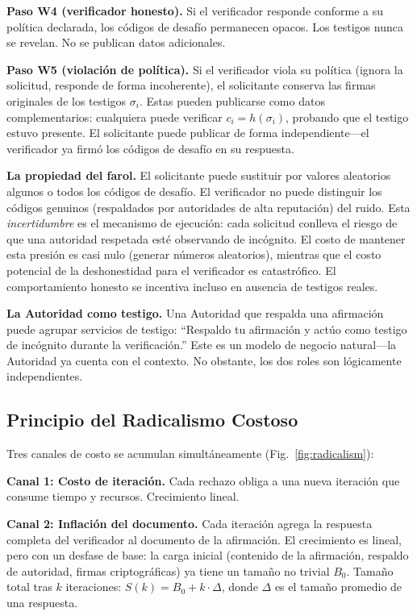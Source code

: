 \documentclass[11pt,a4paper,twocolumn]{article}
\begin{document}
\textbf{Paso W4 (verificador honesto).} Si el verificador responde conforme a su política declarada, los códigos de desafío permanecen opacos. Los testigos nunca se revelan. No se publican datos adicionales.

\textbf{Paso W5 (violación de política).} Si el verificador viola su política (ignora la solicitud, responde de forma incoherente), el solicitante conserva las firmas originales de los testigos $\sigma_i$. Estas pueden publicarse como datos complementarios: cualquiera puede verificar $c_i = h(\sigma_i)$, probando que el testigo estuvo presente. El solicitante puede publicar de forma independiente---el verificador ya firmó los códigos de desafío en su respuesta.

\textbf{La propiedad del farol.} El solicitante puede sustituir por valores aleatorios algunos o todos los códigos de desafío. El verificador no puede distinguir los códigos genuinos (respaldados por autoridades de alta reputación) del ruido. Esta \emph{incertidumbre} es el mecanismo de ejecución: cada solicitud conlleva el riesgo de que una autoridad respetada esté observando de incógnito. El costo de mantener esta presión es casi nulo (generar números aleatorios), mientras que el costo potencial de la deshonestidad para el verificador es catastrófico. El comportamiento honesto se incentiva incluso en ausencia de testigos reales.

\textbf{La Autoridad como testigo.} Una Autoridad que respalda una afirmación puede agrupar servicios de testigo: ``Respaldo tu afirmación y actúo como testigo de incógnito durante la verificación.'' Este es un modelo de negocio natural---la Autoridad ya cuenta con el contexto. No obstante, los dos roles son lógicamente independientes.

\subsection{Principio del Radicalismo Costoso}

Tres canales de costo se acumulan simultáneamente (Fig.~\ref{fig:radicalism}):

\textbf{Canal 1: Costo de iteración.} Cada rechazo obliga a una nueva iteración que consume tiempo y recursos. Crecimiento lineal.

\textbf{Canal 2: Inflación del documento.} Cada iteración agrega la respuesta completa del verificador al documento de la afirmación. El crecimiento es lineal, pero con un desfase de base: la carga inicial (contenido de la afirmación, respaldo de autoridad, firmas criptográficas) ya tiene un tamaño no trivial $B_0$. Tamaño total tras $k$ iteraciones: $S(k) = B_0 + k \cdot \Delta$, donde $\Delta$ es el tamaño promedio de una respuesta.
\end{document}
